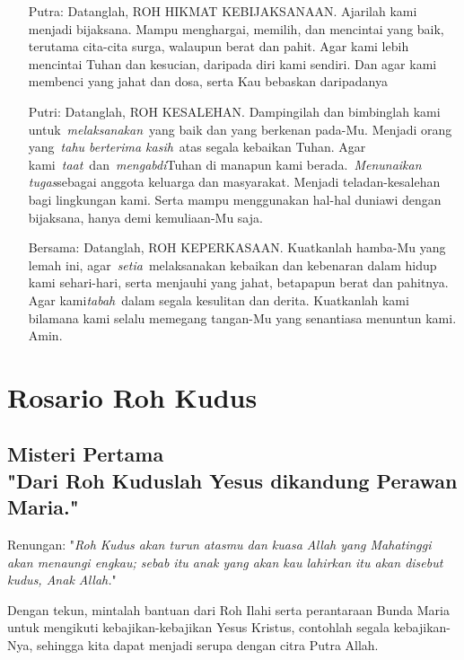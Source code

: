 \documentclass{scrartcl}
\newcommand{\roleSay}[2]{\begin{itemize} \item[#1:] #2 \end{itemize}}
\begin{document}
\roleSay{Putra}{Datanglah, ROH HIKMAT KEBIJAKSANAAN. Ajarilah kami menjadi
bijaksana. Mampu menghargai, memilih, dan mencintai yang baik, terutama
cita-cita surga, walaupun berat dan pahit. Agar kami lebih mencintai
Tuhan dan kesucian, daripada diri kami sendiri. Dan agar kami membenci
yang jahat dan dosa, serta Kau bebaskan daripadanya}

\roleSay{Putri}{Datanglah, ROH KESALEHAN. Dampingilah dan bimbinglah kami
untuk~\emph{melaksanakan}~yang baik dan yang berkenan pada-Mu. Menjadi
orang yang~\emph{tahu berterima kasih}~atas segala kebaikan Tuhan. Agar
kami~\emph{taat}~dan~\emph{mengabdi}Tuhan di manapun kami
berada.~\emph{Menunaikan tugas}sebagai anggota keluarga dan masyarakat.
Menjadi teladan-kesalehan bagi lingkungan kami. Serta mampu menggunakan
hal-hal duniawi dengan bijaksana, hanya demi kemuliaan-Mu saja.}

\roleSay{Bersama}{Datanglah, ROH KEPERKASAAN. Kuatkanlah hamba-Mu yang lemah
ini, agar~\emph{setia}~melaksanakan kebaikan dan kebenaran dalam hidup
kami sehari-hari, serta menjauhi yang jahat, betapapun berat dan
pahitnya. Agar kami\emph{tabah}~dalam segala kesulitan dan derita.
Kuatkanlah kami bilamana kami selalu memegang tangan-Mu yang senantiasa
menuntun kami. Amin.}

\section{Rosario Roh Kudus}

\newcommand{\BSK}{\begin{quote}
\textbf{Bapa Kami \dots (1X)\\
Salam Maria \dots (1X)\\
Kemuliaan \dots (7X)}
\end{quote}
}

\subsection*{Misteri Pertama\\
"Dari Roh Kuduslah Yesus dikandung Perawan Maria."}
Renungan:  "\textit{Roh Kudus akan turun atasmu dan kuasa Allah yang Mahatinggi akan menaungi engkau; sebab itu anak yang akan kau lahirkan itu akan disebut kudus, Anak Allah.}"

Dengan tekun, mintalah bantuan dari Roh Ilahi serta perantaraan Bunda Maria untuk mengikuti kebajikan-kebajikan Yesus Kristus, contohlah segala kebajikan-Nya, sehingga kita dapat menjadi serupa dengan citra Putra Allah.
\end{document}
